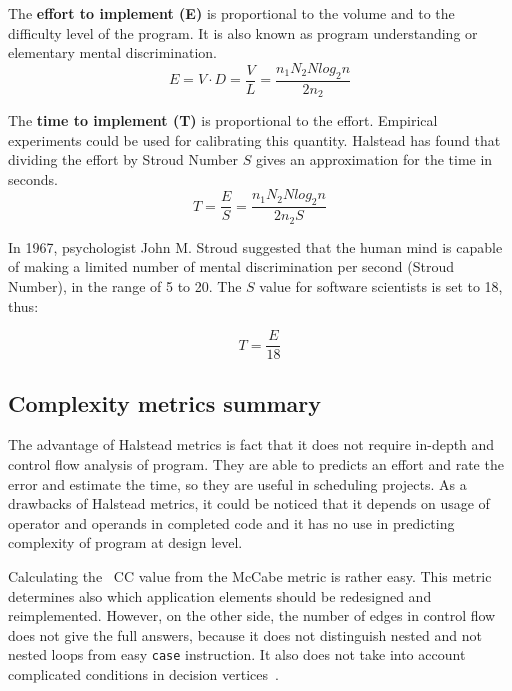 The \textbf{effort to implement (E)} is proportional to the volume and to the difficulty level of the program. It is also known as program understanding or elementary mental discrimination.
\begin{equation}
E=V\cdot D=\frac { V }{ L } =\frac { { n }_{ 1 }{ N }_{ 2 }{ Nlog_{ 2 }{ n } } }{ 2{ n }_{ 2 } } 
\end{equation}

The \textbf{time to implement (T)} is proportional to the effort. Empirical experiments could be used for calibrating this quantity. Halstead has found that dividing the effort by Stroud Number $S$ gives an approximation for the time in seconds.
\begin{equation}
T=\frac { E }{ S } =\frac { { n }_{ 1 }{ N }_{ 2 }{ Nlog_{ 2 }{ n } } }{ 2{ n }_{ 2 }S } 
\end{equation}

In 1967, psychologist John M. Stroud suggested that the human mind is capable of making a limited
number of mental discrimination per second (Stroud Number), in the range of 5 to 20. The $S$ value for software scientists is set to 18, thus: 

\begin{equation}
T=\frac { E }{ 18 } 
\end{equation}

\subsection{Complexity metrics summary}
The advantage of Halstead metrics is fact that it does not require in-depth and control flow analysis of program. They are able to predicts an effort and rate the error and estimate the time, so they are useful in scheduling projects. As a drawbacks of Halstead metrics, it could be noticed that it depends on usage of operator and operands in completed code and it has no use in predicting complexity of program at design level.

Calculating the ~\ac{CC} value from the McCabe metric is rather easy. This metric determines also which application elements should be redesigned and reimplemented. However, on the other side, the number of edges in control flow does not give the full answers, because it does not distinguish nested and not nested loops from easy \texttt{case} instruction. It also does not take into account complicated conditions in decision vertices~\cite{complexity1}.


